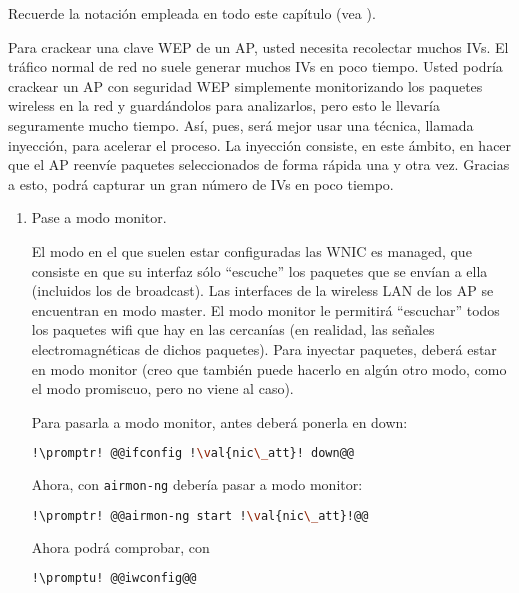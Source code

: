 Recuerde la notación empleada en todo este capítulo (vea ).

Para crackear una clave WEP de un AP, usted necesita recolectar muchos IVs. El tráfico normal de red no suele
generar muchos IVs en poco tiempo. Usted podría crackear un AP con seguridad WEP simplemente monitorizando los
paquetes wireless en la red y guardándolos para analizarlos, pero esto le llevaría seguramente mucho tiempo.
Así, pues, será mejor usar una técnica, llamada inyección, para acelerar el proceso. La inyección consiste, en
este ámbito, en hacer que el AP reenvíe paquetes seleccionados de forma rápida una y otra vez. Gracias a esto,
podrá capturar un gran número de IVs en poco tiempo.

\begin{enumerate}

  \item Pase  a modo monitor.

    El modo en el que suelen estar configuradas las WNIC es managed, que consiste en que su interfaz sólo
    ``escuche'' los paquetes que se envían a ella (incluidos los de broadcast). Las interfaces de la wireless
    LAN de los AP se encuentran en modo master. El modo monitor le permitirá ``escuchar'' todos los paquetes
    wifi que hay en las cercanías (en realidad, las señales electromagnéticas de dichos paquetes). Para inyectar
    paquetes, deberá estar en modo monitor (creo que también puede hacerlo en algún otro modo, como el modo
    promiscuo, pero no viene al caso).

    Para pasarla a modo monitor, antes deberá ponerla en down:

    \begin{lstlisting}[gobble=6,language=bash,style=bashinteract,escapechar=!]
      !\promptr! @@ifconfig !\val{nic\_att}! down@@
    \end{lstlisting}

    Ahora, con \lstinline!airmon-ng! debería pasar a modo monitor:

    \begin{lstlisting}[gobble=6,language=bash,style=bashinteract,escapechar=!]
      !\promptr! @@airmon-ng start !\val{nic\_att}!@@
    \end{lstlisting}

    Ahora podrá comprobar, con

    \begin{lstlisting}[gobble=6,language=bash,style=bashinteract,escapechar=!]
      !\promptu! @@iwconfig@@
    \end{lstlisting}


\end{enumerate}
